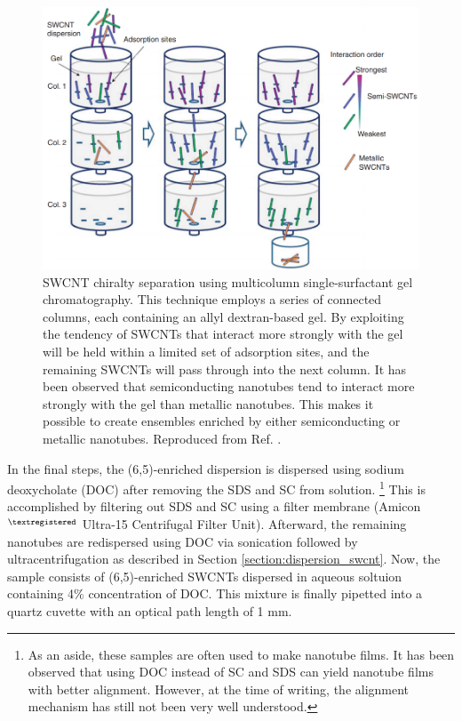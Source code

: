 \begin{figure}[H]
	\centering
	\includegraphics[scale=1.7]{images/chapter_methods/multi_column_kataura}
	\caption{SWCNT chiralty separation using multicolumn single-surfactant gel chromatography. This technique employs a series of connected columns, each containing an allyl dextran-based gel. By exploiting the tendency of SWCNTs that interact more strongly with the gel will be held within a limited set of adsorption sites, and the remaining SWCNTs will pass through into the next column. It has been observed that semiconducting nanotubes tend to interact more strongly with the gel than metallic nanotubes. This makes it possible to create ensembles enriched by either semiconducting or metallic nanotubes. Reproduced from Ref. \cite{liu2011large}.}
	\label{fig:gel_chromatography_kataura}
\end{figure}

In the final steps, the (6,5)-enriched dispersion is dispersed using sodium deoxycholate (DOC) after removing the SDS and SC from solution. \footnote{As an aside, these samples are often used to make nanotube films. It has been observed that using DOC instead of SC and SDS can yield nanotube films with better alignment. However, at the time of writing, the alignment mechanism has still not been very well understood.} This is accomplished by filtering out SDS and SC using a filter membrane (Amicon$^{\tiny\textregistered}$ Ultra-15 Centrifugal Filter Unit). Afterward, the remaining nanotubes are redispersed using DOC via sonication followed by ultracentrifugation as described in Section \ref{section:dispersion_swcnt}. Now, the sample consists of (6,5)-enriched SWCNTs dispersed in aqueous soltuion containing 4\% concentration of DOC. This mixture is finally pipetted into a quartz cuvette with an optical path length of 1 mm.



